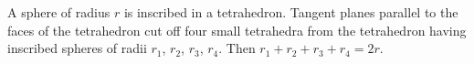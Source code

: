 A sphere of radius $r$ is inscribed in a tetrahedron. Tangent planes parallel to the faces of the tetrahedron cut off four small tetrahedra from the tetrahedron having inscribed spheres of radii $r_1$, $r_2$, $r_3$, $r_4$. Then $r_1 + r_2 + r_3 + r_4 = 2r$.
